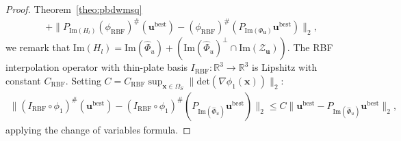 \begin{proof}{Theorem~\ref{theo:pbdwmsq}}
\begin{align*}
    &+\lVert P_{\text{Im}(H_l)}(\phi_{\text{RBF}})^{\#}({\mathbf u}^{\text{best}})-(\phi_{\text{RBF}})^{\#}(P_{\text{Im}(\Phi_{\mathbf u})}{\mathbf u}^{\text{best}})\rVert_2,
  \end{align*}
  we remark that $\text{Im}(H_l) = \text{Im}(\widehat{\Phi}_{u})+\left(\text{Im}(\widehat{\Phi}_{u})^{\perp}\cap\text{Im}(\mathcal{Z}_{\mathbf u})\right)$. The RBF interpolation operator with thin-plate basis $I_{\text{RBF}}:\mathbb{R}^3\rightarrow\mathbb{R}^3$ is Lipshitz with constant $C_{\text{RBF}}$. Setting $C=C_{\text{RBF}}\sup_{\mathbf{x}\in \Omega_{S}} \lVert\text{det}(\nabla \phi_1(\mathbf{x}))\rVert_2$:
  \begin{align*}
    \lVert (I_{\text{RBF}}\circ\phi_1)^{\#}({\mathbf u}^{\text{best}})-(I_{\text{RBF}}\circ\phi_1)^{\#}(P_{\text{Im}(\widehat{\Phi}_{u})} {\mathbf u}^{\text{best}})\rVert_2\leq C\lVert {\mathbf u}^{\text{best}}-P_{\text{Im}(\widehat{\Phi}_{u})} {\mathbf u}^{\text{best}}\rVert_2,
  \end{align*}
  applying the change of variables formula.
\end{proof}

